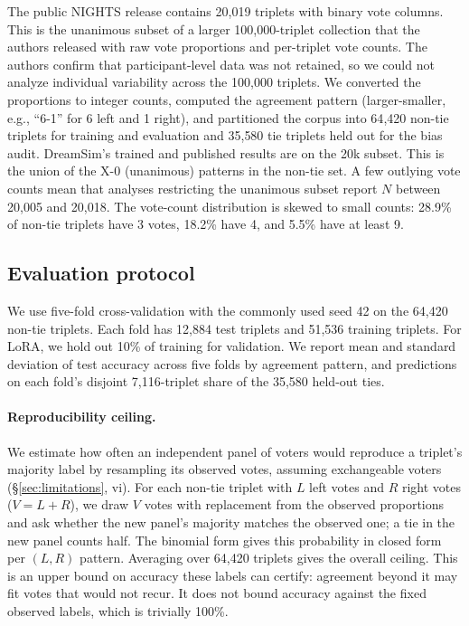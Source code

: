 \documentclass{article}
\begin{document}
The public NIGHTS release contains 20{,}019 triplets with binary vote columns. This is the unanimous subset of a larger 100{,}000-triplet collection that the authors released with raw vote proportions and per-triplet vote counts. The authors confirm that participant-level data was not retained, so we could not analyze individual variability across the 100{,}000 triplets. We converted the proportions to integer counts, computed the agreement pattern (larger-smaller, e.g., ``6-1'' for 6 left and 1 right), and partitioned the corpus into 64{,}420 non-tie triplets for training and evaluation and 35{,}580 tie triplets held out for the bias audit. DreamSim's trained and published results are on the  20k subset. This is the union of the X-0 (unanimous) patterns in the non-tie set. A few outlying vote counts mean that analyses restricting the unanimous subset report $N$ between 20{,}005 and 20{,}018. The vote-count distribution is skewed to small counts: 28.9\% of non-tie triplets have 3 votes, 18.2\% have 4, and 5.5\% have at least 9.

\subsection{Evaluation protocol}

We use five-fold cross-validation with the commonly used seed 42 on the 64,420 non-tie triplets. Each fold has 12,884 test triplets and 51,536 training triplets. For LoRA, we hold out 10\% of training for validation. We report mean and standard deviation of test accuracy across five folds by agreement pattern, and predictions on each fold's disjoint 7,116-triplet share of the 35,580 held-out ties.


\paragraph{Reproducibility ceiling.} We estimate how often an independent panel of voters would reproduce a triplet's majority label by resampling its observed votes, assuming exchangeable voters (\S\ref{sec:limitations}, vi). For each non-tie triplet with $L$ left votes and $R$ right votes ($V = L+R$), we draw $V$ votes with replacement from the observed proportions and ask whether the new panel's majority matches the observed one; a tie in the new panel counts half. The binomial form gives this probability in closed form per $(L,R)$ pattern. Averaging over 64{,}420 triplets gives the overall ceiling. This is an upper bound on accuracy these labels can certify: agreement beyond it may fit votes that would not recur. It does not bound accuracy against the fixed observed labels, which is trivially 100\%.
\end{document}
